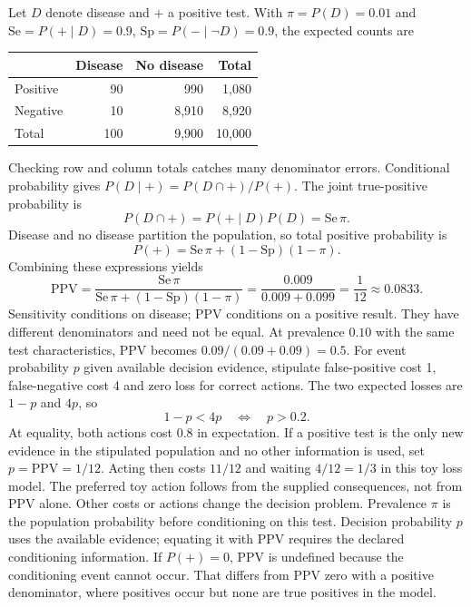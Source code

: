 Let $D$ denote disease and $+$ a positive test. With $\pi=P(D)=0.01$ and $\mathrm{Se}=P(+\mid D)=0.9$, $\mathrm{Sp}=P(-\mid\neg D)=0.9$, the expected counts are
\begin{center}
\begin{tabular}{lrrr}
\toprule
& Disease & No disease & Total\\\midrule
Positive & 90 & 990 & 1,080\\
Negative & 10 & 8,910 & 8,920\\\midrule
Total & 100 & 9,900 & 10,000\\\bottomrule
\end{tabular}
\end{center}
Checking row and column totals catches many denominator errors.
Conditional probability gives $P(D\mid+)=P(D\cap+)/P(+)$. The joint true-positive probability is
\[
P(D\cap+)=P(+\mid D)P(D)=\mathrm{Se}\,\pi.
\]
Disease and no disease partition the population, so total positive probability is
\[
P(+)=\mathrm{Se}\,\pi+(1-\mathrm{Sp})(1-\pi).
\]
Combining these expressions yields
\[
\mathrm{PPV}=\frac{\mathrm{Se}\,\pi}
{\mathrm{Se}\,\pi+(1-\mathrm{Sp})(1-\pi)}
=\frac{0.009}{0.009+0.099}=\frac1{12}\approx0.0833.
\]
Sensitivity conditions on disease; PPV conditions on a positive result. They have different denominators and need not be equal. At prevalence $0.10$ with the same test characteristics, PPV becomes $0.09/(0.09+0.09)=0.5$.
For event probability $p$ given available decision evidence, stipulate false-positive cost 1, false-negative cost 4 and zero loss for correct actions. The two expected losses are $1-p$ and $4p$, so
\[
1-p<4p\quad\Longleftrightarrow\quad p>0.2.
\]
At equality, both actions cost $0.8$ in expectation. If a positive test is the only new evidence in the stipulated population and no other information is used, set $p=\mathrm{PPV}=1/12$. Acting then costs $11/12$ and waiting $4/12=1/3$ in this toy loss model. The preferred toy action follows from the supplied consequences, not from PPV alone. Other costs or actions change the decision problem.
Prevalence $\pi$ is the population probability before conditioning on this test. Decision probability $p$ uses the available evidence; equating it with PPV requires the declared conditioning information. If $P(+)=0$, PPV is undefined because the conditioning event cannot occur. That differs from PPV zero with a positive denominator, where positives occur but none are true positives in the model.

